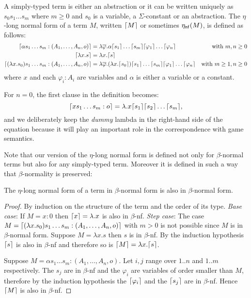 \begin{dfn}
A simply-typed term is either an abstraction or it can be written uniquely as
$s_0 s_1 \ldots s_m$ where $m\geq0$ and $s_0$ is a variable, a $\Sigma$-constant or an abstraction.
The $\eta$-long normal form of a term $M$, written $\lceil M\rceil$ or sometimes $\eta_{\sf nf}(M)$,
is defined as follows:
\begin{align*}
\lceil \alpha s_1 \ldots s_m : (A_1,\ldots,A_n,o)\rceil &= \lambda \overline{\varphi} . \alpha \lceil s_1\rceil\ldots \lceil s_m\rceil \lceil \varphi_1\rceil \ldots \lceil \varphi_n\rceil
& \mbox{with $m,n\geq0$}\\
\lceil \lambda x . s \rceil &= \lambda x . \lceil s\rceil \\
\lceil (\lambda x . s_0) s_1 \ldots s_m : (A_1,\ldots,A_n,o) \rceil &= \lambda \overline{\varphi} . (\lambda x . \lceil s_0\rceil) \lceil s_1\rceil \ldots \lceil s_m\rceil \lceil \varphi_1\rceil \ldots \lceil \varphi_n\rceil
& \mbox{with $m\geq 1,n\geq0$}
\end{align*}
where $x$ and each $\varphi_i : A_i$ are variables and $\alpha$ is
either a variable or a constant.
\end{dfn}

For $n=0$, the first clause in the definition becomes:
$$\lceil x s_1 \ldots s_m : o\rceil = \lambda . x \lceil s_1\rceil \lceil s_2\rceil \ldots \lceil s_m\rceil,$$
and we deliberately keep the \textsl{dummy} lambda in the right-hand
side of the equation because it will play an important role in the
correspondence with game semantics.



Note that our version of the $\eta$-long normal form is defined not only for $\beta$-normal terms but also for any simply-typed term.
Moreover it is defined in such a way that $\beta$-normality is preserved:
\begin{lem}
The $\eta$-long normal form of a term in $\beta$-normal form is also in $\beta$-normal form.
\end{lem}
\begin{proof}
By induction on the structure of the term and the order of its type.
\emph{Base case}:
If $M=x:0$ then $\lceil x\rceil = \lambda . x$ is also in $\beta$-nf.
\emph{Step case}:
The case $M = \lceil (\lambda x . s_0) s_1 \ldots s_m : (A_1,\ldots,A_n,o)\rceil$ with $m>0$ is not possible since $M$ is in
$\beta$-normal form.
Suppose $M = \lambda x . s$ then $s$ is in $\beta$-nf. By the induction hypothesis $\lceil s\rceil$ is also in $\beta$-nf and therefore
so is $\lceil M\rceil = \lambda x . \lceil s\rceil$.

Suppose $M= \alpha s_1 \ldots s_m : (A_1,\ldots,A_n,o)$. Let $i,j$
range over $1..n$ and $1..m$ respectively. The $s_j$ are in
$\beta$-nf and the $\varphi_i$ are variables of order smaller than
$M$, therefore by the induction hypothesis the $\lceil \varphi_i\rceil$ and
the $\lceil s_j\rceil$ are in $\beta$-nf. Hence $\lceil M\rceil$ is also in
$\beta$-nf.
\end{proof}


